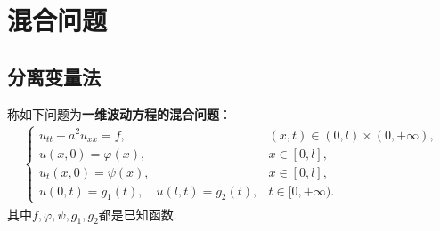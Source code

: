 \documentclass[../../main.tex]{subfiles}%
\begin{document}
\section{混合问题}

\subsection{分离变量法}

\begin{definition}
称如下问题为\textbf{一维波动方程的混合问题}：
\begin{align}
\begin{cases}
u_{tt}-a^2u_{xx}=f, & (x,t)\in(0,l)\times(0,+\infty), \\
u(x,0)=\varphi(x), & x\in[0,l], \\
u_t(x,0)=\psi(x), & x\in[0,l], \\
u(0,t)=g_1(t),\quad u(l,t)=g_2(t), & t\in[0,+\infty).
\end{cases} \label{eq:wave-mixed}
\end{align}
其中$f,\varphi ,\psi,g_1,g_2$都是已知函数.
\end{definition}
\end{document}
